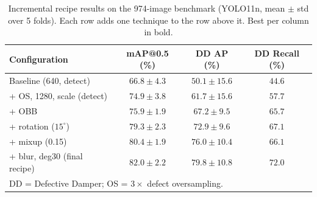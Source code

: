 \documentclass[conference]{IEEEtran}
\makeatletter
\newcommand{\dd}{Defective Damper}
\newcommand{\map}{mAP@0.5}
\makeatother
\begin{document}
\begin{table}[t]
\caption{Incremental recipe results on the 974-image benchmark (YOLO11n, mean $\pm$ std over 5 folds). Each row adds one technique to the row above it. Best per column in bold.}
\label{tab:ladderres}
\centering
\scriptsize
\setlength{\tabcolsep}{3.5pt}
\begin{tabular}{lccc}
\toprule
Configuration & \map{} (\%) & DD AP (\%) & DD Recall (\%) \\
\midrule
Baseline (640, detect) & $66.8 \pm 4.3$ & $50.1 \pm 15.6$ & $44.6$ \\
+ OS, 1280, scale (detect) & $74.9 \pm 3.8$ & $61.7 \pm 15.6$ & $57.7$ \\
+ OBB & $75.9 \pm 1.9$ & $67.2 \pm 9.5$ & $65.7$ \\
+ rotation ($15^\circ$) & $79.3 \pm 2.3$ & $72.9 \pm 9.6$ & $67.1$ \\
+ mixup (0.15) & $80.4 \pm 1.9$ & $76.0 \pm 10.4$ & $66.1$ \\
+ blur, deg30 (final recipe) & $\mathbf{82.0 \pm 2.2}$ & $\mathbf{79.8 \pm 10.8}$ & $\mathbf{72.0}$ \\
\bottomrule
\multicolumn{4}{l}{DD = \dd{}; OS = $3\times$ defect oversampling.}
\end{tabular}
\end{table}
\end{document}
